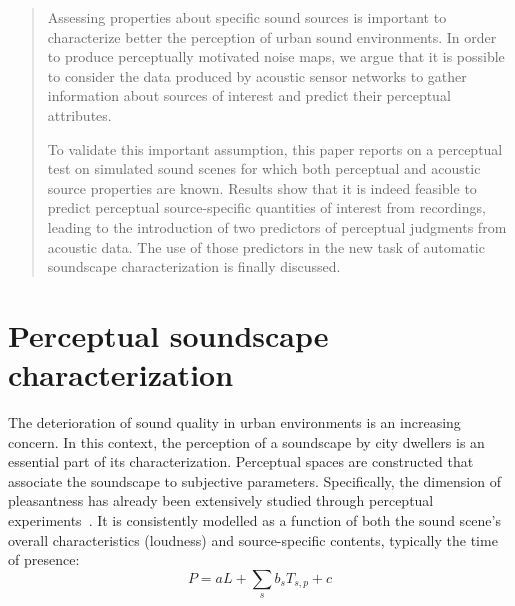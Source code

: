 \documentclass[a0,portrait]{a0poster}
\begin{document}
\begin{multicols}{2} %


\color{Navy} %

\begin{abstract}

Assessing properties about specific sound sources is important to  characterize better the perception of urban sound environments. In order to produce perceptually motivated noise maps, we argue that it is possible to consider the data produced by acoustic sensor networks to gather information about sources of interest and predict their perceptual attributes.

To validate this important assumption, this paper reports on a perceptual test on simulated sound scenes for which both perceptual and acoustic source properties are known. Results show that it is indeed feasible to predict perceptual source-specific quantities of interest from recordings, leading to the introduction of two predictors of perceptual judgments from acoustic data. The use of those predictors in the new task of automatic soundscape characterization is finally discussed.

\end{abstract}




\color{SaddleBrown} %

\section*{Perceptual soundscape characterization}

The deterioration of sound quality in urban environments is an increasing concern. In this context, the perception of a soundscape by city dwellers is an essential part of its characterization. Perceptual spaces are constructed that associate the soundscape to subjective parameters. Specifically, the dimension of pleasantness has already been extensively studied through perceptual experiments~\cite{aumond2017}. It is consistently modelled as a function of both the sound scene's overall characteristics (loudness) and source-specific contents, typically the time of presence: 
\begin{equation}
P = aL + \sum_s b_sT_{s,p} + c
\end{equation}


\end{multicols}
\end{document}
